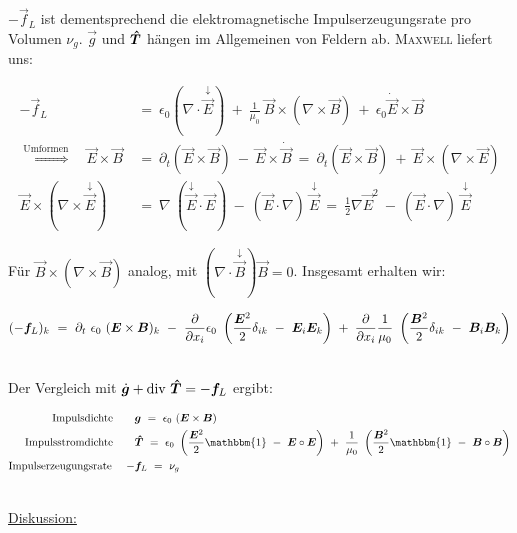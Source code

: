 $ - \vec{f}_L$ ist dementsprechend die elektromagnetische Impulserzeugungsrate pro Volumen $\nu_g$.
$\vec{g}$ und $\bm{\hat{T}}$ hängen im Allgemeinen von Feldern ab. \textsc{Maxwell} liefert uns:

\begin{align*}
- \vec{f}_L \ &= \ \epsilon_0 ( \nabla \cdot\overset{\downarrow}{\vec{E}} ) \ + \ \frac{1}{\mu_0} \ \vec{B} \times (\nabla \times \vec{B}) \ + \ \epsilon_0 \dot{\vec{E}} \times \vec{B}\\
\overset{\text{Umformen}}{\Longrightarrow} \quad\vec{E}\times\vec{B} \ &= \ \partial_t ( \vec{E} \times \vec{B} ) \ - \ \vec{E}\times\dot{\vec{B}} \ =  \ \partial_t (\vec{E}\times\vec{B}) \ + \ \vec{E}\times (\nabla\times\vec{E})\\
\vec{E}\times ( \nabla\times \overset{\downarrow}{\vec{E}} ) \ &= \ \nabla \ (\overset{\downarrow}{\vec{E}}\cdot\vec{E} ) \ - \ ( \vec{E}\cdot\nabla ) \ \overset{\downarrow}{\vec{E}} \ = \ \frac{1}{2}\nabla\vec{E}^2 \ - \ ( \vec{E}\cdot\nabla) \ \overset{\downarrow}{\vec{E}}
\end{align*}

Für $\vec{B}\times(\nabla\times\vec{B})$ analog, mit $(\nabla\cdot\overset{\downarrow}{\vec{B}})\vec{B}=0$. Insgesamt erhalten wir:

\begin{equation*}
(-\vec{f}_L)_k \ = \ \partial_t \ \epsilon_0 \ (\vec{E}\times\vec{B})_k \ - \ \pdiff{}{x_i} \epsilon_0 \ \left(\frac{\vec{E}^2}{2} \delta_{ik} \ - \ \vec{E}_i \vec{E}_k \right) \; + \; \pdiff{}{x_i} \frac{1}{\mu_0} \ \left(\frac{\vec{B}^2}{2}\delta_{ik} \ - \ \vec{B}_i \vec{B}_k \right) 
\end{equation*}

\ \\
Der Vergleich mit $\dot{\bm{g}} + \text{div }\bm{\hat{T}} = - \bm{f}_L$ ergibt:

\begin{align*}
\text{Impulsdichte} \qquad & \vec{g} \ = \ \epsilon_0 \ (\vec{E}\times\vec{B})\\
\text{Impulsstromdichte} \qquad & \tens{T} \ = \ \epsilon_0 \ \left(\frac{\vec{E}^2}{2} \mathbbm{1} \ - \ \vec{E}\circ\vec{E}\right) \ + \ \frac{1}{\mu_0} \ \left(\frac{\vec{B}^2}{2}\mathbbm{1} \ - \ \vec{B}\circ\vec{B}\right)\\
\text{Impulserzeugungsrate} \quad \ - & \vec{f}_L \ = \ \nu_g
\end{align*}

\ \\
\underline{Diskussion:}

